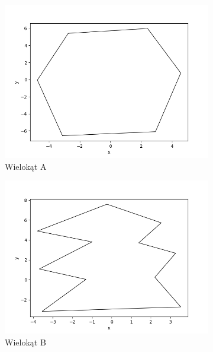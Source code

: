 \documentclass[11pt,a4paper]{article}
\begin{document}
\begin{figure}[H]
    \centering
    \begin{subfigure}[b]{0.46\textwidth}
        \centering
        \includegraphics[scale=0.4]{res/pol_a.png}
        \caption{
            Wielokąt A
        }
    \end{subfigure}
    \begin{subfigure}[b]{0.46\textwidth}
        \centering
        \includegraphics[scale=0.4]{res/pol_b.png}
        \caption{
            Wielokąt B
        }
    \end{subfigure}
    \begin{subfigure}[b]{0.46\textwidth}
        \centering

\end{subfigure}
\end{figure}
\end{document}
